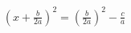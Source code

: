 \documentclass[preview]{standalone}
\begin{document}
\begin{align*}
(x+ \frac{b}{2a})^2 = (\frac{b}{2a})^2 -\frac{c}{a}
\end{align*}
\end{document}

